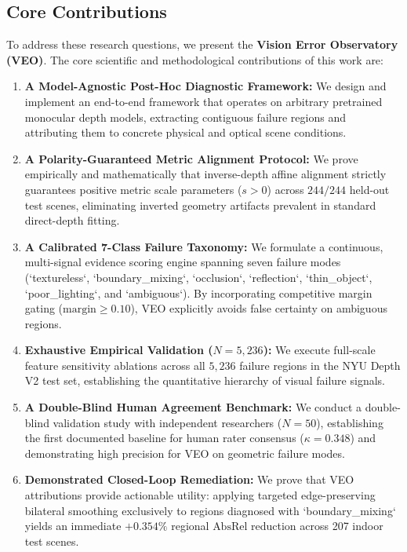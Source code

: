 \documentclass[11pt,a4paper]{article}
\begin{document}
\subsection{Core Contributions}
To address these research questions, we present the \textbf{Vision Error Observatory (VEO)}. The core scientific and methodological contributions of this work are:
\begin{enumerate}
    \item \textbf{A Model-Agnostic Post-Hoc Diagnostic Framework:} We design and implement an end-to-end framework that operates on arbitrary pretrained monocular depth models, extracting contiguous failure regions and attributing them to concrete physical and optical scene conditions.
    \item \textbf{A Polarity-Guaranteed Metric Alignment Protocol:} We prove empirically and mathematically that inverse-depth affine alignment strictly guarantees positive metric scale parameters ($s > 0$) across $244/244$ held-out test scenes, eliminating inverted geometry artifacts prevalent in standard direct-depth fitting.
    \item \textbf{A Calibrated 7-Class Failure Taxonomy:} We formulate a continuous, multi-signal evidence scoring engine spanning seven failure modes (`textureless`, `boundary\_mixing`, `occlusion`, `reflection`, `thin\_object`, `poor\_lighting`, and `ambiguous`). By incorporating competitive margin gating ($\text{margin} \ge 0.10$), VEO explicitly avoids false certainty on ambiguous regions.
    \item \textbf{Exhaustive Empirical Validation ($N=5,236$):} We execute full-scale feature sensitivity ablations across all $5,236$ failure regions in the NYU Depth V2 test set, establishing the quantitative hierarchy of visual failure signals.
    \item \textbf{A Double-Blind Human Agreement Benchmark:} We conduct a double-blind validation study with independent researchers ($N=50$), establishing the first documented baseline for human rater consensus ($\kappa = 0.348$) and demonstrating high precision for VEO on geometric failure modes.
    \item \textbf{Demonstrated Closed-Loop Remediation:} We prove that VEO attributions provide actionable utility: applying targeted edge-preserving bilateral smoothing exclusively to regions diagnosed with `boundary\_mixing` yields an immediate $+0.354\%$ regional $\text{AbsRel}$ reduction across 207 indoor test scenes.
\end{enumerate}
\end{document}
